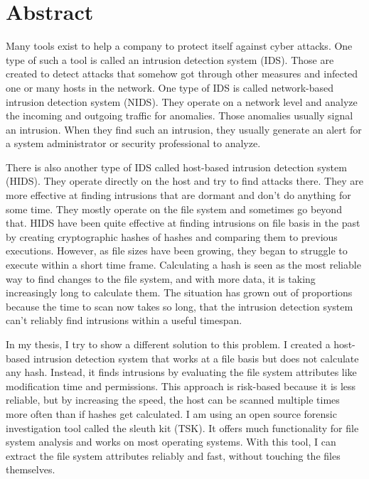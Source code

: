 \chapter*{Abstract}
\label{chap:abstract}

Many tools exist to help a company to protect itself against cyber attacks. One type of such a tool is called an intrusion detection system (IDS). Those are created to detect attacks that somehow got through other measures and infected one or many hosts in the network. One type of IDS is called network-based intrusion detection system (NIDS). They operate on a network level and analyze the incoming and outgoing traffic for anomalies. Those anomalies usually signal an intrusion. When they find such an intrusion, they usually generate an alert for a system administrator or security professional to analyze.

There is also another type of IDS called host-based intrusion detection system (HIDS). They operate directly on the host and try to find attacks there. They are more effective at finding intrusions that are dormant and don't do anything for some time. They mostly operate on the file system and sometimes go beyond that. HIDS have been quite effective at finding intrusions on file basis in the past by creating cryptographic hashes of hashes and comparing them to previous executions. However, as file sizes have been growing, they began to struggle to execute within a short time frame. Calculating a hash is seen as the most reliable way to find changes to the file system, and with more data, it is taking increasingly long to calculate them. The situation has grown out of proportions because the time to scan now takes so long, that the intrusion detection system can't reliably find intrusions within a useful timespan.

In my thesis, I try to show a different solution to this problem. I created a host-based intrusion detection system that works at a file basis but does not calculate any hash. Instead, it finds intrusions by evaluating the file system attributes like modification time and permissions. This approach is risk-based because it is less reliable, but by increasing the speed, the host can be scanned multiple times more often than if hashes get calculated. I am using an open source forensic investigation tool called the sleuth kit (TSK). It offers much functionality for file system analysis and works on most operating systems. With this tool, I can extract the file system attributes reliably and fast, without touching the files themselves.

